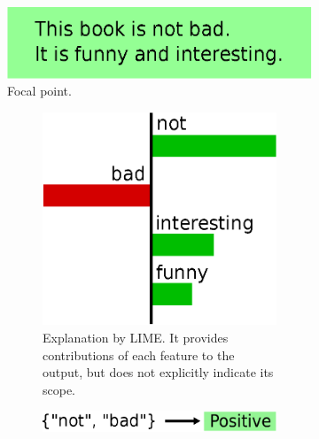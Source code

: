 \documentclass[runningheads]{llncs}
\begin{document}
\begin{figure}[t]
	\centering
	\vspace{0.5cm}
	\begin{subfigure}[t]{0.55\textwidth}
		\centering
		\includegraphics[scale=0.35]{example-instance}
		\caption{Focal point.}\label{fig:example-instance}
	\end{subfigure}
	\hfill
	\begin{subfigure}[t]{0.45\textwidth}
		\begin{subfigure}[t]{\textwidth}
			\centering
			\includegraphics[scale=0.35]{example-lime}
			\caption{%
				Explanation by LIME\@.
				It provides contributions of each feature to the output,
				but does not explicitly indicate its scope.
			}\label{fig:example-lime}
			\vspace{0.4cm}
		\end{subfigure}
		\begin{subfigure}[t]{\textwidth}
			\centering
			\includegraphics[scale=0.35]{example-anchor}

\end{subfigure}
\end{subfigure}
\end{figure}
\end{document}
